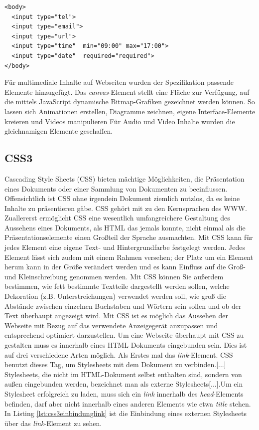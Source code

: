 \documentclass[12pt,a4paper,bibliography=totocnumbered,listof=totocnumbered]{scrartcl}
\begin{document}
    \vspace{1em}
	\begin{lstlisting}[caption=HTML5 \textit{input}-Element, label=lst:html5input]
<body>
  <input type="tel">
  <input type="email">
  <input type="url">  
  <input type="time"  min="09:00" max="17:00">
  <input type="date"  required="required">
</body>
	\end{lstlisting}
	
Für multimediale Inhalte auf Webseiten wurden der Spezifikation passende Elemente hinzugefügt. Das \textit{canvas}-Element \glqq [...] stellt eine Fläche zur Verfügung, auf die mittels JavaScript dynamische Bitmap-Grafiken gezeichnet werden können. So lassen sich Animationen erstellen, Diagramme zeichnen, eigene Interface-Elemente kreieren und Videos manipulieren\grqq{}\cite[S.353]{KronHTML2011} Für Audio und Video Inhalte wurden die gleichnamigen Elemente geschaffen. 
	
\subsection{CSS3}
\glqq Cascading Style Sheets (CSS) bieten mächtige Möglichkeiten, die Präsentation eines Dokuments oder einer Sammlung von Dokumenten zu beeinflussen. Offensichtlich ist CSS ohne irgendein Dokument ziemlich nutzlos, da es keine Inhalte zu präsentieren gäbe.\grqq{}\cite[S.1]{MeyeCasc2005} CSS gehört mit zu den Kernsprachen des WWW. \glqq Zuallererst ermöglicht CSS eine wesentlich umfangreichere Gestaltung des Aussehens eines Dokuments, als HTML das jemals konnte, nicht einmal als die Präsentationselemente einen Großteil der Sprache ausmachten. Mit CSS kann für jedes Element eine eigene Text- und Hintergrundfarbe festgelegt werden. Jedes Element lässt sich zudem mit einem Rahmen versehen; der Platz um ein Element herum kann in der Größe verändert werden und es kann Einfluss auf die Groß- und Kleinschreibung genommen werden. Mit CSS können Sie außerdem  bestimmen, wie fett bestimmte Textteile dargestellt werden sollen, welche Dekoration (z.B. Unterstreichungen) verwendet werden soll, wie groß die Abstände zwischen einzelnen Buchstaben und Wörtern sein sollen und ob der Text überhaupt angezeigt wird.\grqq{}\cite[S.4]{MeyeCasc2005} Mit CSS ist es möglich das Aussehen der Webseite mit Bezug auf das verwendete Anzeigegerät anzupassen und entsprechend optimiert darzustellen. Um eine Webseite überhaupt mit CSS zu gestalten muss es innerhalb eines HTML Dokuments eingebunden sein. Dies ist auf drei verschiedene Arten möglich. Als Erstes mal das \textit{link}-Element. \glqq CSS benutzt dieses Tag, um Stylesheets mit dem Dokument zu verbinden.[...] Stylesheets, die nicht im HTML-Dokument selbst enthalten sind, sondern von außen eingebunden werden, bezeichnet man als externe Stylesheets[...].Um ein Stylesheet erfolgreich zu laden, muss sich ein \textit{link} innerhalb des \textit{head}-Elements befinden, darf aber nicht innerhalb eines anderen Elements wie etwa \textit{title} stehen.\grqq{}\cite[S.14]{MeyeCasc2005} In Listing \ref{lst:css3einbindunglink} ist die Einbindung eines externen Stylesheets über das \textit{link}-Element zu sehen.
	
\end{document}
